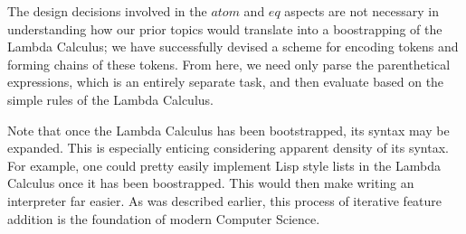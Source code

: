 \documentclass{article}
\begin{document}
The design decisions involved in the $atom$ and $eq$ aspects are not necessary in understanding how our prior
topics would translate into a boostrapping of the Lambda Calculus; we have successfully devised a scheme
for encoding tokens and forming chains of these tokens. From here, we need only parse the parenthetical
expressions, which is an entirely separate task, and then evaluate based on the simple rules of the Lambda
Calculus.

Note that once the Lambda Calculus has been bootstrapped, its syntax may be expanded. This is especially
enticing considering apparent density of its syntax. For example, one could pretty easily implement Lisp
style lists in the Lambda Calculus once it has been boostrapped. This would then make writing an interpreter
far easier. As was described earlier, this process of iterative feature addition is the foundation of modern
Computer Science.
\end{document}
